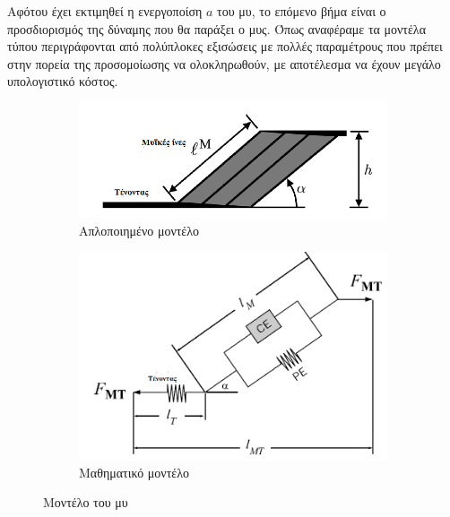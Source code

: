 Αφότου έχει εκτιμηθεί η ενεργοποίση $a$ του μυ, το επόμενο βήμα είναι ο προσδιορισμός της δύναμης που θα παράξει ο μυς. Όπως αναφέραμε τα μοντέλα τύπου  περιγράφονται από πολύπλοκες εξισώσεις με πολλές παραμέτρους που πρέπει στην πορεία της προσομοίωσης να ολοκληρωθούν, με αποτέλεσμα να έχουν μεγάλο υπολογιστικό κόστος.

\begin{figure}[H]
    \centering
    \begin{subfigure}[t]{.5\textwidth}
        \includegraphics[width=\textwidth, keepaspectratio]{fig/simple-muscle-model.png}
        \caption{Απλοποιημένο μοντέλο\cite{millard13}}
        \label{fig:simple-mascle-model}
    \end{subfigure}
    \begin{subfigure}[t]{.4\textwidth}
        \includegraphics[width=\textwidth, keepaspectratio]{fig/muscle-model.png}
        \caption{Μαθηματικό μοντέλο\cite{erdemir07}}
        \label{fig:muscle-model}
    \end{subfigure}
    \caption{Μοντέλο του μυ}
\end{figure}

